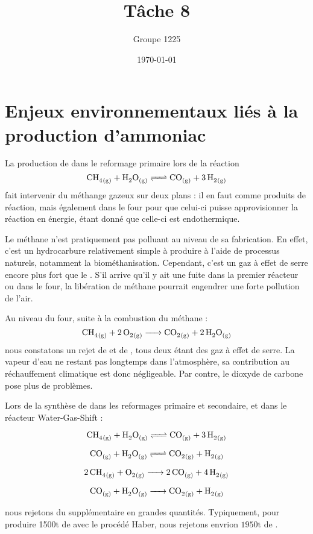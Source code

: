 \documentclass[a4paper, oneside, 12pt]{article}
\title{Tâche 8}
\author{Groupe 1225}
\date{\today}
\begin{document}
\maketitle

\section*{Enjeux environnementaux liés à la production d'ammoniac}

La production de  dans le reformage primaire lors de la réaction
\[ \ce{CH4_{(g)} + H2O_{(g)} <=> CO_{(g)} + 3 \, H2_{(g)}} \]
fait intervenir du méthange gazeux sur deux plans : il en faut comme produits de réaction,
mais également dans le four pour que celui-ci puisse approvisionner la réaction en énergie,
étant donné que celle-ci est endothermique. 

Le méthane n'est pratiquement pas polluant au niveau de sa fabrication. 
En effet, c'est un hydrocarbure relativement simple à produire à l'aide 
de processus naturels, notamment la biométhanisation. 
Cependant, c'est un gaz à effet de serre encore plus fort que le .
S'il arrive qu'il y ait une fuite dans la premier réacteur ou dans le four, 
la libération de méthane pourrait engendrer une forte pollution de l'air.

Au niveau du four, suite à la combustion du méthane : 
\[ \ce{CH4_{(g)} + 2 \, O2_{(g)} -> CO2_{(g)} + 2 \, H2O_{(g)}} \] 
nous constatons un rejet de  et de , 
tous deux étant des gaz à effet de serre. 
La vapeur d'eau ne restant pas longtemps dans l'atmosphère,
sa contribution au réchauffement climatique est donc négligeable. %
Par contre, le dioxyde de carbone pose plus de problèmes. 

Lors de la synthèse de  dans les reformages primaire et secondaire, 
et dans le réacteur Water-Gas-Shift : 

\[ \ce{CH4_{(g)} + H2O_{(g)} <=> CO_{(g)} + 3 \, H2_{(g)}} \]

\[ \ce{CO_{(g)} + H2O_{(g)} <=> CO2_{(g)} + H2_{(g)}} \]

\[ \ce{2 \, CH4_{(g)} + O2_{(g)} -> {2} \, CO_{(g)} + 4 \, H2_{(g)}} \]
	
\[ \ce{CO_{(g)} + H2O_{(g)} -> CO2_{(g)} + H2_{(g)}} \]

nous rejetons du  supplémentaire en grandes quantités. 
Typiquement, pour produire 1500t de  avec le procédé Haber, 
nous rejetons envrion $1950\si{\tonne}$ de .
\end{document}
